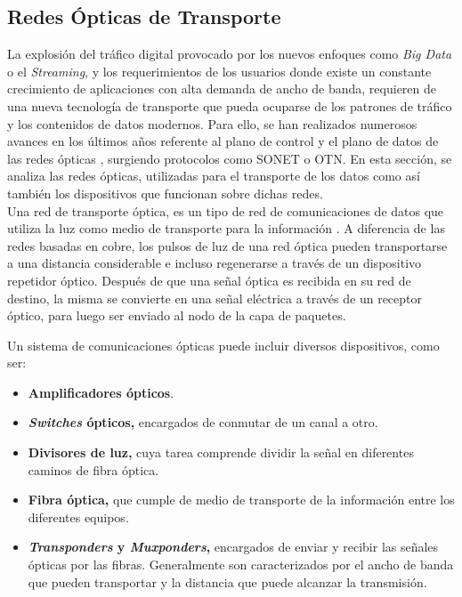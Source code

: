 \subsection{Redes Ópticas de Transporte}
La explosión del tráfico digital provocado por los nuevos enfoques como \textit{Big Data} o el \textit{Streaming}, y los requerimientos de los usuarios donde existe un constante crecimiento de aplicaciones con alta demanda de ancho de banda, requieren de una nueva tecnología de transporte que pueda ocuparse de los patrones de tráfico y los contenidos de datos modernos. Para ello, se han realizados numerosos avances en los últimos años referente al plano de control y el plano de datos de las redes ópticas \parencite{redesopticas}, surgiendo protocolos como SONET o OTN. En esta sección, se analiza las redes ópticas, utilizadas para el transporte de los datos como así también los dispositivos que funcionan sobre dichas redes. 
\\

Una red de transporte óptica, es un tipo de red de comunicaciones de datos que utiliza la luz como medio de transporte para la información \parencite{redesopticasdef}. A diferencia de las redes basadas en cobre, los pulsos de luz de una red óptica pueden transportarse a una distancia considerable e incluso regenerarse a través de un dispositivo repetidor óptico. Después de que una señal óptica es recibida en su red de destino, la misma se convierte en una señal eléctrica a través de un receptor óptico, para luego ser enviado al nodo de la capa de paquetes. 

Un sistema de comunicaciones ópticas puede incluir diversos dispositivos, como ser:

\begin{itemize}
	\item \textbf{Amplificadores ópticos}. 
	\item \textbf{\textit{Switches} ópticos,} encargados de conmutar de un canal a otro.
	\item \textbf{Divisores de luz,} cuya tarea comprende dividir la señal en diferentes caminos de fibra óptica.
	\item \textbf{Fibra óptica,} que cumple de medio de transporte de la información entre los diferentes equipos.
	\item \textbf{\textit{Transponders} y \textit{Muxponders},} encargados de enviar y recibir las señales ópticas por las fibras. Generalmente son caracterizados por el ancho de banda que pueden transportar y la distancia que puede alcanzar la transmisión.
\end{itemize}


